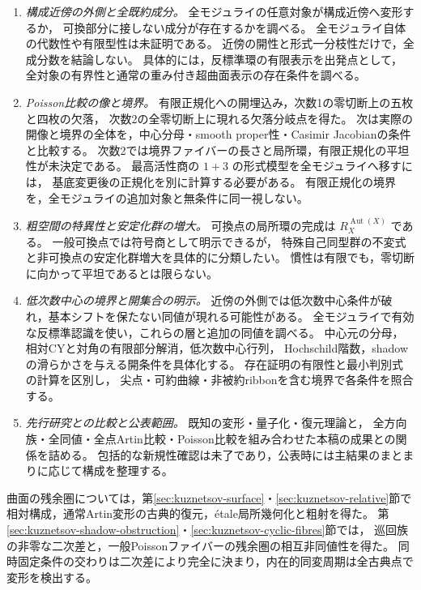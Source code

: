 \documentclass[a4paper,11pt]{ltjsarticle}
\numberwithin{equation}{section}
\theoremstyle{plain}
\theoremstyle{definition}
\theoremstyle{remark}
\begin{document}
\begin{enumerate}
\item \emph{構成近傍の外側と全既約成分。}
      全モジュライの任意対象が構成近傍へ変形するか，
      可換部分に接しない成分が存在するかを調べる。
      全モジュライ自体の代数性や有限型性は未証明である。
      近傍の開性と形式一分枝性だけで，全成分数を結論しない。
      具体的には，反標準環の有限表示を出発点として，
      全対象の有界性と通常の重み付き超曲面表示の存在条件を調べる。
\item \emph{Poisson比較の像と境界。}
      有限正規化への開埋込み，次数1の零切断上の五枚と四枚の欠落，
      次数2の全零切断上に現れる欠落分岐点を得た。
      次は実際の開像と境界の全体を，中心分母・smooth proper性・Casimir Jacobianの条件と比較する。
      次数2では境界ファイバーの長さと局所環，有限正規化の平坦性が未決定である。
      最高活性商の $1+3$ の形式模型を全モジュライへ移すには，
      基底変更後の正規化を別に計算する必要がある。
      有限正規化の境界を，全モジュライの追加対象と無条件に同一視しない。
\item \emph{粗空間の特異性と安定化群の増大。}
      可換点の局所環の完成は $R_X^{\operatorname{Aut}(X)}$ である。
      一般可換点では符号商として明示できるが，
      特殊自己同型群の不変式と非可換点の安定化群増大を具体的に分類したい。
      慣性は有限でも，零切断に向かって平坦であるとは限らない。
\item \emph{低次数中心の境界と開集合の明示。}
      近傍の外側では低次数中心条件が破れ，基本シフトを保たない同値が現れる可能性がある。
      全モジュライで有効な反標準認識を使い，これらの層と追加の同値を調べる。
      中心元の分母，相対CYと対角の有限部分解消，低次数中心行列，
      Hochschild階数，shadowの滑らかさを与える開条件を具体化する。
      存在証明の有限性と最小判別式の計算を区別し，
      尖点・可約曲線・非被約ribbonを含む境界で各条件を照合する。
\item \emph{先行研究との比較と公表範囲。}
      既知の変形・量子化・復元理論と，
      全方向族・全同値・全点Artin比較・Poisson比較を組み合わせた本稿の成果との関係を詰める。
      包括的な新規性確認は未了であり，公表時には主結果のまとまりに応じて構成を整理する。
\end{enumerate}
曲面の残余圏については，第\ref{sec:kuznetsov-surface}・\ref{sec:kuznetsov-relative}節で
相対構成，通常Artin変形の古典的復元，\'{e}tale局所幾何化と粗射を得た。
第\ref{sec:kuznetsov-shadow-obstruction}・\ref{sec:kuznetsov-cyclic-fibres}節では，
巡回族の非零な二次差と，一般Poissonファイバーの残余圏の相互非同値性を得た。
同時固定条件の交わりは二次差により完全に決まり，内在的同変周期は全古典点で変形を検出する。
\end{document}
